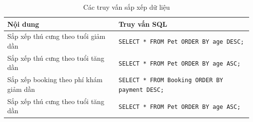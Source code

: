 \begin{table}[htbp]
    \centering
    \caption{Các truy vấn sắp xếp dữ liệu}
    \label{tab:sort_queries}
    \begin{tabularx}{\textwidth}{|p{5cm}|X|}
        \hline
        \textbf{Nội dung} & \textbf{Truy vấn SQL} \\ \hline

        Sắp xếp thú cưng theo tuổi giảm dần &
        \texttt{SELECT * FROM Pet ORDER BY age DESC;}
        \\ \hline

        Sắp xếp thú cưng theo tuổi tăng dần &
        \texttt{SELECT * FROM Pet ORDER BY age ASC;}
        \\ \hline

        Sắp xếp booking theo phí khám giảm dần &
        \texttt{SELECT * FROM Booking ORDER BY payment DESC;}
        \\ \hline

        Sắp xếp thú cưng theo tuổi tăng dần &
        \texttt{SELECT * FROM Pet ORDER BY age ASC;}
        \\ \hline
    \end{tabularx}
\end{table}


